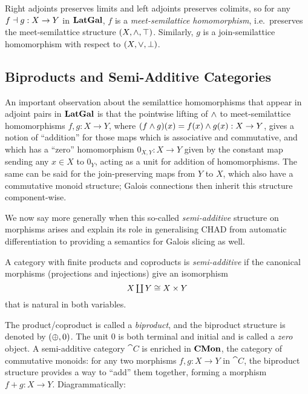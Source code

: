 \noindent Right adjoints preserves limits and left adjoints preserves colimits, so for any $f \dashv g: X \to Y$
in $\mathbf{LatGal}$, $f$ is a \emph{meet-semilattice homomorphism}, i.e.~preserves the meet-semilattice structure
$(X, \wedge, \top)$. Similarly, $g$ is a join-semilattice homomorphism with respect to $(X, \vee, \bot)$.

\subsection{Biproducts and Semi-Additive Categories}

An important observation about the semilattice homomorphisms that appear in adjoint pairs in $\mathbf{LatGal}$ is that
the pointwise lifting of $\wedge$ to meet-semilattice homomorphisms $f, g: X \to Y$, where $(f \wedge g)(x) =
f(x) \wedge g(x): X \to Y$, gives a notion of ``addition'' for those maps which is associative and commutative,
and which has a ``zero'' homomorphism $0_{X,Y}: X \to Y$ given by the constant map sending any $x \in X$ to
$0_Y$, acting as a unit for addition of homomorphisms. The same can be said for the join-preserving maps from
$Y$ to $X$, which also have a commutative monoid structure; Galois connections then inherit this structure
component-wise.

We now say more generally when this so-called \emph{semi-additive} structure on morphisms arises and explain
its role in generalising CHAD from automatic differentiation to providing a semantics for Galois slicing as
well.

\begin{definition}
A category with finite products and coproducts is \emph{semi-additive} if the canonical morphisms (projections
and injections) give an isomorphism
\[\textstyle X \coprod Y \cong X \times Y\] that is natural in both variables.
\end{definition}

The product/coproduct is called a \emph{biproduct}, and the biproduct structure is denoted by $(\oplus, 0)$.
The unit $0$ is both terminal and initial and is called a \emph{zero} object.  A semi-additive category $\cat{C}$ is enriched in $\mathbf{CMon}$, the
category of commutative monoids: for any two morphisms $f, g: X \to Y$ in $\cat{C}$, the biproduct structure
provides a way to ``add'' them together, forming a morphism $f + g: X \to Y$. Diagrammatically:

\begin{center}
\end{center}


